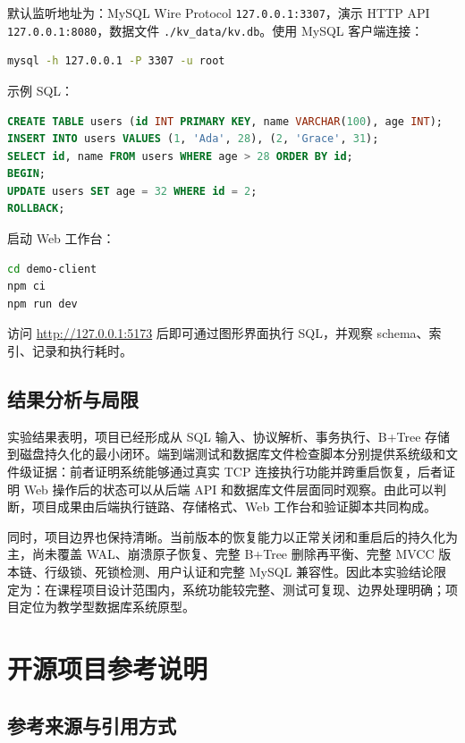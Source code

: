 \documentclass[UTF8,a4paper,12pt]{ctexart}
\newcommand{\code}[1]{\texttt{#1}}
\begin{document}
默认监听地址为：MySQL Wire Protocol \code{127.0.0.1:3307}，演示 HTTP API \code{127.0.0.1:8080}，数据文件 \code{./kv\_data/kv.db}。使用 MySQL 客户端连接：

\begin{lstlisting}[language=bash]
mysql -h 127.0.0.1 -P 3307 -u root
\end{lstlisting}

示例 SQL：

\begin{lstlisting}[language=SQL]
CREATE TABLE users (id INT PRIMARY KEY, name VARCHAR(100), age INT);
INSERT INTO users VALUES (1, 'Ada', 28), (2, 'Grace', 31);
SELECT id, name FROM users WHERE age > 28 ORDER BY id;
BEGIN;
UPDATE users SET age = 32 WHERE id = 2;
ROLLBACK;
\end{lstlisting}

启动 Web 工作台：

\begin{lstlisting}[language=bash]
cd demo-client
npm ci
npm run dev
\end{lstlisting}

访问 \url{http://127.0.0.1:5173} 后即可通过图形界面执行 SQL，并观察 schema、索引、记录和执行耗时。

\subsection{结果分析与局限}

实验结果表明，项目已经形成从 SQL 输入、协议解析、事务执行、B+Tree 存储到磁盘持久化的最小闭环。端到端测试和数据库文件检查脚本分别提供系统级和文件级证据：前者证明系统能够通过真实 TCP 连接执行功能并跨重启恢复，后者证明 Web 操作后的状态可以从后端 API 和数据库文件层面同时观察。由此可以判断，项目成果由后端执行链路、存储格式、Web 工作台和验证脚本共同构成。

同时，项目边界也保持清晰。当前版本的恢复能力以正常关闭和重启后的持久化为主，尚未覆盖 WAL、崩溃原子恢复、完整 B+Tree 删除再平衡、完整 MVCC 版本链、行级锁、死锁检测、用户认证和完整 MySQL 兼容性。因此本实验结论限定为：在课程项目设计范围内，系统功能较完整、测试可复现、边界处理明确；项目定位为教学型数据库系统原型。

\section{开源项目参考说明}

\subsection{参考来源与引用方式}
\end{document}
